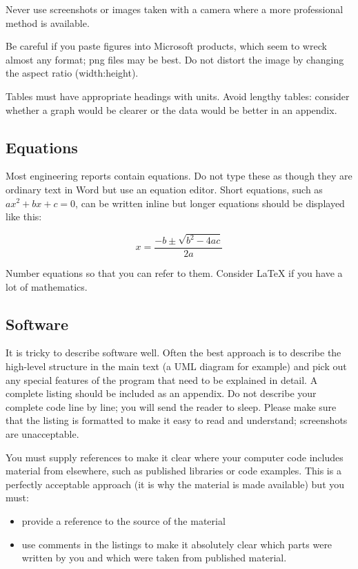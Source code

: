 Never use screenshots or images taken with a camera where a more professional
method is available.

Be careful if you paste figures into Microsoft products, which seem to wreck
almost any format; png files may be best. Do not distort the image by changing
the aspect ratio (width:height).

Tables must have appropriate headings with units. Avoid lengthy tables: consider
whether a graph would be clearer or the data would be better in an appendix.

\subsection{Equations}

Most engineering reports contain equations. Do not type these as though they are
ordinary text in Word but use an equation editor. Short equations, such as
\(ax^2+bx+c=0\), can be written inline but longer equations should be displayed
like this:

\begin{equation}
    x=\frac{-b\pm\sqrt{b^2-4ac}}{2a}
\end{equation}

Number equations so that you can refer to them. Consider \LaTeX{} if you have a
lot of mathematics.

\subsection{Software}

It is tricky to describe software well. Often the best approach is to describe
the high-level structure in the main text (a UML diagram for example) and pick
out any special features of the program that need to be explained in detail. A
complete listing should be included as an appendix. Do not describe your
complete code line by line; you will send the reader to sleep. Please make sure
that the listing is formatted to make it easy to read and understand;
screenshots are unacceptable.

You must supply references to make it clear where your computer code includes
material from elsewhere, such as published libraries or code examples. This is a
perfectly acceptable approach (it is why the material is made available) but you
must:

\begin{itemize}
    \item provide a reference to the source of the material
    \item use comments in the listings to make it absolutely clear which parts
          were written by you and which were taken from published material.
\end{itemize}

